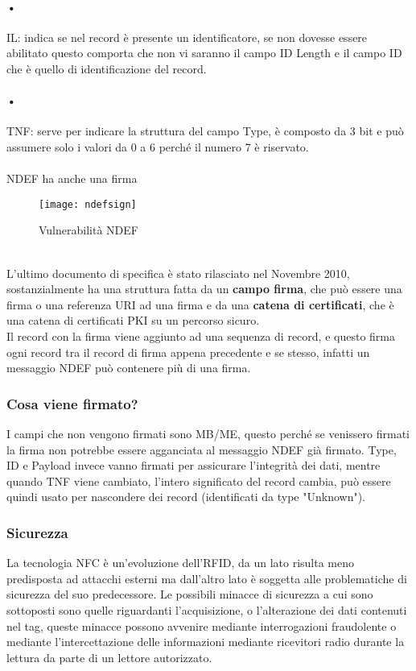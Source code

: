 \paragraph{•} IL: indica se nel record è presente un identificatore, se non dovesse essere abilitato questo comporta che non vi saranno il campo ID Length e il campo ID che è quello di identificazione del record.
\paragraph{•}TNF: serve per indicare la struttura del campo Type, è composto da 3 bit e può assumere solo i valori da 0 a 6 perché il numero 7 è riservato.
\\\\NDEF ha anche una firma
\begin{figure}[h]
\begin{center}
\texttt{[image: ndefsign]}
\caption[NDEF Vulnerabilità]{Vulnerabilità NDEF\footnotemark}
\end{center}
\end{figure}
\\L'ultimo documento di specifica è stato rilasciato nel Novembre 2010, sostanzialmente ha una struttura fatta da un \textbf{campo firma}, che può essere una firma o una referenza URI ad una firma e da una \textbf{catena di certificati}, che è una catena di certificati PKI su un percorso sicuro.
\\Il record con la firma viene aggiunto ad una sequenza di record, e questo firma ogni record tra il record di firma appena precedente e se stesso, infatti un messaggio NDEF può contenere più di una firma.
\subsubsection{Cosa viene firmato?}
\hspace{\parindent} I campi che non vengono firmati sono MB/ME, questo perché se venissero firmati la firma non potrebbe essere agganciata al messaggio NDEF già firmato. Type, ID e Payload invece vanno firmati per assicurare l'integrità dei dati, mentre quando TNF viene cambiato, l'intero significato del record cambia, può essere quindi usato per nascondere dei record (identificati da type "Unknown"). 
\subsubsection{Sicurezza}
\hspace{\parindent}La tecnologia NFC è un'evoluzione dell'RFID, da un lato risulta meno predisposta ad attacchi esterni ma dall'altro lato è soggetta alle problematiche di sicurezza del suo predecessore. Le possibili minacce di sicurezza a cui sono sottoposti sono quelle riguardanti l'acquisizione, o l'alterazione dei dati contenuti nel tag, queste minacce possono avvenire mediante interrogazioni fraudolente o mediante l'intercettazione delle informazioni mediante ricevitori radio durante la lettura da parte di un lettore autorizzato.
